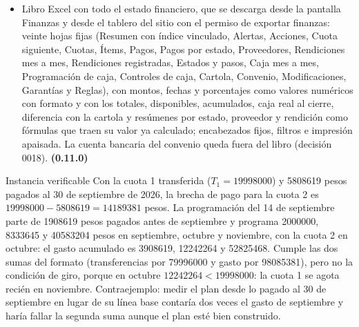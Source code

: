 \documentclass[11pt,a4paper]{article}
\begin{document}
\begin{itemize}
\item Libro Excel con todo el estado financiero, que se descarga desde la pantalla Finanzas y desde el tablero del sitio con el permiso de exportar finanzas: veinte hojas fijas (Resumen con índice vinculado, Alertas, Acciones, Cuota siguiente, Cuotas, Ítems, Pagos, Pagos por estado, Proveedores, Rendiciones mes a mes, Rendiciones registradas, Estados y pasos, Caja mes a mes, Programación de caja, Controles de caja, Cartola, Convenio, Modificaciones, Garantías y Reglas), con montos, fechas y porcentajes como valores numéricos con formato y con los totales, disponibles, acumulados, caja real al cierre, diferencia con la cartola y resúmenes por estado, proveedor y rendición como fórmulas que traen su valor ya calculado; encabezados fijos, filtros e impresión apaisada. La cuenta bancaria del convenio queda fuera del libro (decisión 0018). \textbf{(0.11.0)}
\end{itemize}

\begin{cajaacento}{Instancia verificable}
Con la cuota 1 transferida ($T_1=\num{19998000}$) y \num{5808619} pesos pagados al 30 de septiembre de 2026, la brecha de pago para la cuota 2 es $\num{19998000}-\num{5808619}=\num{14189381}$ pesos. La programación del 14 de septiembre parte de \num{1908619} pesos pagados antes de septiembre y programa \num{2000000}, \num{8333645} y \num{40583204} pesos en septiembre, octubre y noviembre, con la cuota 2 en octubre: el gasto acumulado es \num{3908619}, \num{12242264} y \num{52825468}. Cumple las dos sumas del formato (transferencias por \num{79996000} y gasto por \num{98085381}), pero no la condición de giro, porque en octubre $\num{12242264}<\num{19998000}$: la cuota 1 se agota recién en noviembre. Contraejemplo: medir el plan desde lo pagado al 30 de septiembre en lugar de su línea base contaría dos veces el gasto de septiembre y haría fallar la segunda suma aunque el plan esté bien construido.
\end{cajaacento}
\end{document}
